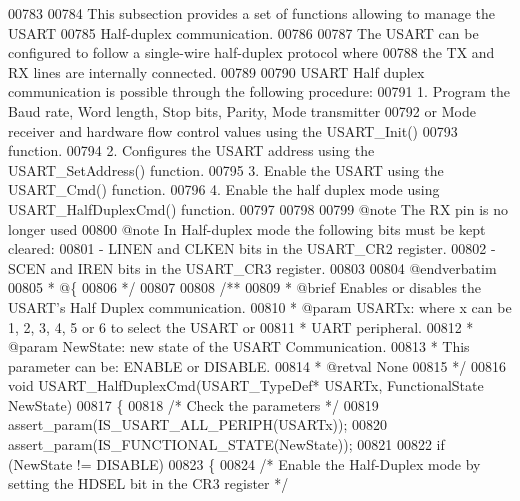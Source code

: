 \begin{DoxyCode}
00783 \textcolor{comment}{}
00784 \textcolor{comment}{  This subsection provides a set of functions allowing to manage the USART }
00785 \textcolor{comment}{  Half-duplex communication.}
00786 \textcolor{comment}{  }
00787 \textcolor{comment}{  The USART can be configured to follow a single-wire half-duplex protocol where }
00788 \textcolor{comment}{  the TX and RX lines are internally connected.}
00789 \textcolor{comment}{}
00790 \textcolor{comment}{  USART Half duplex communication is possible through the following procedure:}
00791 \textcolor{comment}{     1. Program the Baud rate, Word length, Stop bits, Parity, Mode transmitter }
00792 \textcolor{comment}{        or Mode receiver and hardware flow control values using the USART\_Init()}
00793 \textcolor{comment}{        function.}
00794 \textcolor{comment}{     2. Configures the USART address using the USART\_SetAddress() function.}
00795 \textcolor{comment}{     3. Enable the USART using the USART\_Cmd() function.}
00796 \textcolor{comment}{     4. Enable the half duplex mode using USART\_HalfDuplexCmd() function.}
00797 \textcolor{comment}{}
00798 \textcolor{comment}{}
00799 \textcolor{comment}{@note The RX pin is no longer used}
00800 \textcolor{comment}{@note In Half-duplex mode the following bits must be kept cleared:}
00801 \textcolor{comment}{        - LINEN and CLKEN bits in the USART\_CR2 register.}
00802 \textcolor{comment}{        - SCEN and IREN bits in the USART\_CR3 register.}
00803 \textcolor{comment}{}
00804 \textcolor{comment}{@endverbatim}
00805 \textcolor{comment}{  * @\{}
00806 \textcolor{comment}{  */}
00807 
00808 \textcolor{comment}{/**}
00809 \textcolor{comment}{  * @brief  Enables or disables the USART's Half Duplex communication.}
00810 \textcolor{comment}{  * @param  USARTx: where x can be 1, 2, 3, 4, 5 or 6 to select the USART or }
00811 \textcolor{comment}{  *         UART peripheral.}
00812 \textcolor{comment}{  * @param  NewState: new state of the USART Communication.}
00813 \textcolor{comment}{  *          This parameter can be: ENABLE or DISABLE.}
00814 \textcolor{comment}{  * @retval None}
00815 \textcolor{comment}{  */}
00816 \textcolor{keywordtype}{void} USART_HalfDuplexCmd(USART\_TypeDef* USARTx, FunctionalState NewState)
00817 \{
00818   \textcolor{comment}{/* Check the parameters */}
00819   assert_param(IS\_USART\_ALL\_PERIPH(USARTx));
00820   assert_param(IS\_FUNCTIONAL\_STATE(NewState));
00821 
00822   \textcolor{keywordflow}{if} (NewState != DISABLE)
00823   \{
00824     \textcolor{comment}{/* Enable the Half-Duplex mode by setting the HDSEL bit in the CR3 register */}

\end{DoxyCode}
